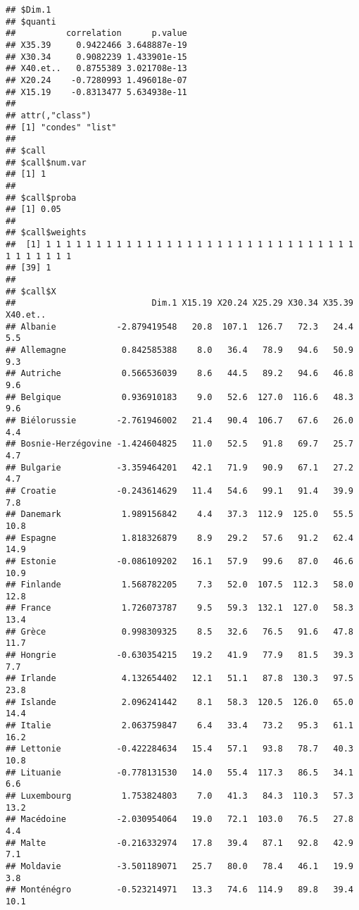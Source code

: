 \documentclass[
]{article}
\begin{document}
\begin{verbatim}
## $Dim.1
## $quanti
##          correlation      p.value
## X35.39     0.9422466 3.648887e-19
## X30.34     0.9082239 1.433901e-15
## X40.et..   0.8755389 3.021708e-13
## X20.24    -0.7280993 1.496018e-07
## X15.19    -0.8313477 5.634938e-11
## 
## attr(,"class")
## [1] "condes" "list"  
## 
## $call
## $call$num.var
## [1] 1
## 
## $call$proba
## [1] 0.05
## 
## $call$weights
##  [1] 1 1 1 1 1 1 1 1 1 1 1 1 1 1 1 1 1 1 1 1 1 1 1 1 1 1 1 1 1 1 1 1 1 1 1 1 1 1
## [39] 1
## 
## $call$X
##                           Dim.1 X15.19 X20.24 X25.29 X30.34 X35.39 X40.et..
## Albanie            -2.879419548   20.8  107.1  126.7   72.3   24.4      5.5
## Allemagne           0.842585388    8.0   36.4   78.9   94.6   50.9      9.3
## Autriche            0.566536039    8.6   44.5   89.2   94.6   46.8      9.6
## Belgique            0.936910183    9.0   52.6  127.0  116.6   48.3      9.6
## Biélorussie        -2.761946002   21.4   90.4  106.7   67.6   26.0      4.4
## Bosnie-Herzégovine -1.424604825   11.0   52.5   91.8   69.7   25.7      4.7
## Bulgarie           -3.359464201   42.1   71.9   90.9   67.1   27.2      4.7
## Croatie            -0.243614629   11.4   54.6   99.1   91.4   39.9      7.8
## Danemark            1.989156842    4.4   37.3  112.9  125.0   55.5     10.8
## Espagne             1.818326879    8.9   29.2   57.6   91.2   62.4     14.9
## Estonie            -0.086109202   16.1   57.9   99.6   87.0   46.6     10.9
## Finlande            1.568782205    7.3   52.0  107.5  112.3   58.0     12.8
## France              1.726073787    9.5   59.3  132.1  127.0   58.3     13.4
## Grèce               0.998309325    8.5   32.6   76.5   91.6   47.8     11.7
## Hongrie            -0.630354215   19.2   41.9   77.9   81.5   39.3      7.7
## Irlande             4.132654402   12.1   51.1   87.8  130.3   97.5     23.8
## Islande             2.096241442    8.1   58.3  120.5  126.0   65.0     14.4
## Italie              2.063759847    6.4   33.4   73.2   95.3   61.1     16.2
## Lettonie           -0.422284634   15.4   57.1   93.8   78.7   40.3     10.8
## Lituanie           -0.778131530   14.0   55.4  117.3   86.5   34.1      6.6
## Luxembourg          1.753824803    7.0   41.3   84.3  110.3   57.3     13.2
## Macédoine          -2.030954064   19.0   72.1  103.0   76.5   27.8      4.4
## Malte              -0.216332974   17.8   39.4   87.1   92.8   42.9      7.1
## Moldavie           -3.501189071   25.7   80.0   78.4   46.1   19.9      3.8
## Monténégro         -0.523214971   13.3   74.6  114.9   89.8   39.4     10.1

\end{verbatim}
\end{document}

